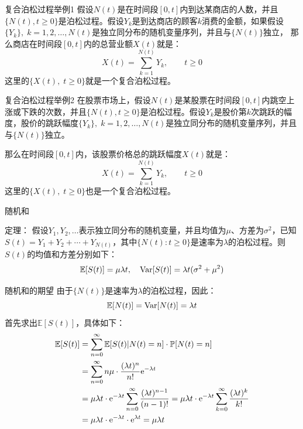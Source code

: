 \documentclass[t]{beamer}
\renewcommand{\Pr}{\mathbb{P}}
\newcommand{\E}{\mathbb{E}}
\newcommand{\Var}{{\rm Var}}
\begin{document}
\begin{frame}{复合泊松过程举例1}
    假设$N(t)$是在时间段$[0,t]$内到达某商店的人数，并且$\{N(t), t\ge 0\}$是泊松过程。假设$Y_k$是到达商店的顾客$k$消费的金额，如果假设$\{Y_k\}, \; k=1,2,\ldots,N(t)$是独立同分布的随机变量序列，并且与$\{N(t)\}$独立，
那么商店在时间段$[0,t]$内的总营业额$X(t)$就是：
\[X(t)=\sum^{N(t)}_{k=1}Y_k, \qquad t \ge 0 \]
这里的$\{X(t), \; t\ge 0\}$就是一个复合泊松过程。
\end{frame}


\begin{frame}{复合泊松过程举例2}
    在股票市场上，假设$N(t)$是某股票在时间段$[0,t]$内跳空上涨或下跌的次数，并且$\{N(t), t\ge 0\}$是泊松过程。假设$Y_k$是股价第$k$次跳跃的幅度，股价的跳跃幅度$\{Y_k\}, \; k=1,2,\ldots,N(t)$是独立同分布的随机变量序列，并且与$\{N(t)\}$独立。

那么在时间段$[0,t]$内，该股票价格总的跳跃幅度$X(t)$就是：
\[X(t)=\sum^{N(t)}_{k=1}Y_k, \qquad t\ge 0 \]
这里的$\{X(t), \; t\ge 0\}$也是一个复合泊松过程。
\end{frame}


\begin{frame}{随机和}
    \begin{block}{定理：}
        假设$Y_1,Y_2,\ldots$表示独立同分布的随机变量，并且均值为$\mu$、方差为$\sigma^2$，已知$S(t)=Y_1+Y_2+\cdots+Y_{N(t)}$，其中$\{N(t):t\ge 0\}$是速率为$\lambda$的泊松过程。则$S(t)$的均值和方差分别如下：
        \[\E[S(t)]=\mu\lambda t,\quad \Var[S(t)]=\lambda t(\sigma^2+\mu^2) \]
    \end{block}
\end{frame}



\begin{frame}{随机和的期望}
    由于$\{N(t)\}$是速率为$\lambda$的泊松过程，因此：
	\[\E[N(t)]=\Var[N(t)]=\lambda t \]
首先求出$\E[S(t)]$，具体如下：
\[\begin{split}
\E[S(t)]&= \sum^{\infty}_{n=0}\E[S(t)|N(t)=n]\cdot \Pr[N(t)=n]\\
&=\sum^{\infty}_{n=0} n\mu\cdot \frac{(\lambda t)^n}{n!}{\rm e}^{-\lambda t}\\
&=\mu \lambda t\cdot {\rm e}^{-\lambda t}\sum^{\infty}_{n=0} \frac{(\lambda t)^{n-1}}{(n-1)!}=\mu \lambda t\cdot {\rm e}^{-\lambda t}\sum^{\infty}_{k=0} \frac{(\lambda t)^k}{k!}\\
&=\mu \lambda t\cdot {\rm e}^{-\lambda t}\cdot {\rm e}^{\lambda t}=\mu \lambda t
\end{split} \]
\end{frame}
\end{document}
